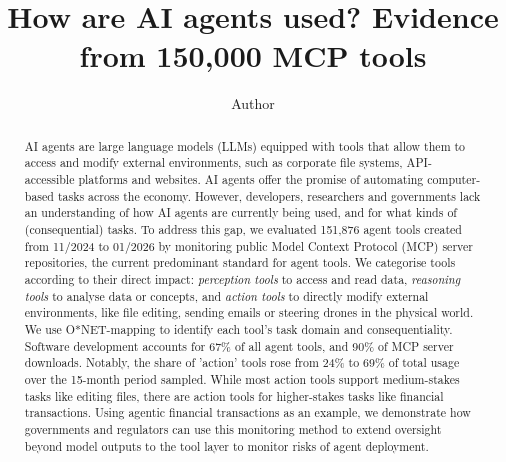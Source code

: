\documentclass[manuscript,screen,nonacm,oneside]{acmart}
\begin{document}
\title[How are AI agents used? Evidence from 150,000 MCP ...]{How are AI agents used? Evidence from 150,000 MCP tools}

\author{Author}

\renewcommand{\shortauthors}{Author}

\begin{abstract}
AI agents are large language models (LLMs) equipped with tools that allow them to access and modify external environments, such as corporate file systems, API-accessible platforms and websites. AI agents offer the promise of automating computer-based tasks across the economy. However, developers, researchers and governments lack an understanding of how AI agents are currently being used, and for what kinds of (consequential) tasks. To address this gap, we evaluated 151,876 agent tools created from 11/2024 to 01/2026 by monitoring public Model Context Protocol (MCP) server repositories, the current predominant standard for agent tools. We categorise tools according to their direct impact: \emph{perception tools} to access and read data, \emph{reasoning tools} to analyse data or concepts, and \emph{action tools} to directly modify external environments, like file editing, sending emails or steering drones in the physical world. We use O*NET-mapping to identify each tool's task domain and consequentiality. Software development accounts for 67\% of all agent tools, and 90\% of MCP server downloads. Notably, the share of 'action' tools rose from 24\% to 69\% of total usage over the 15-month period sampled. While most action tools support medium-stakes tasks like editing files, there are action tools for higher-stakes tasks like financial transactions. Using agentic financial transactions as an example, we demonstrate how governments and regulators can use this monitoring method to extend oversight beyond model outputs to the tool layer to monitor  risks of agent deployment.
\end{abstract}

\end{document}
